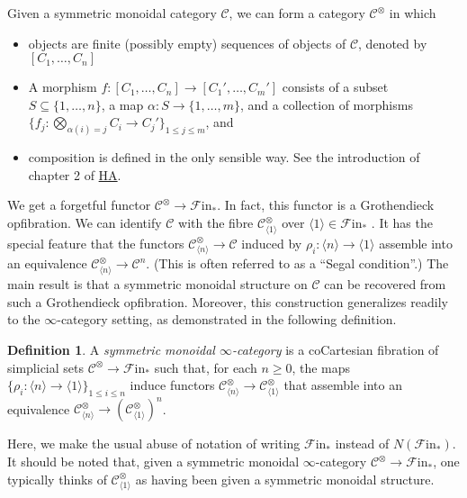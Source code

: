 \documentclass[letterpaper]{article}
\theoremstyle{definition}
\newtheorem{definition}[lemma]{Definition}
\begin{document}
Given a symmetric monoidal category $\mathcal{C}$, we can form a category $\mathcal{C}^\otimes$ in which
\begin{itemize}
    \item objects are finite (possibly empty) sequences of objects of $\mathcal{C}$, denoted by $[C_1, \ldots, C_n]$
    \item A morphism $f : [C_1, \ldots, C_n] \to [C_1', \ldots, C_m']$ consists of a subset $S \subseteq \{1, \ldots, n\}$, a map $\alpha : S \to \{1, \ldots, m\}$, and a collection of morphisms $\{f_j: \bigotimes_{\alpha(i)=j} C_i\to C_j'\}_{1 \leq j \leq m}$, and
    \item composition is defined in the only sensible way. See the introduction of chapter 2 of \href{References/LurieHigherAlgebra.pdf}{HA}.
\end{itemize}
We get a forgetful functor $\mathcal{C}^\otimes \to \mathscr{F}\mathrm{in}_*$. In fact, this functor is a Grothendieck opfibration. We can identify $\mathcal{C}$ with the fibre $\mathcal{C}^\otimes_{\langle 1 \rangle}$ over $\langle 1 \rangle \in \mathscr{F}\mathrm{in}_*$ . It has the special feature that the functors $\mathcal{C}^\otimes_{\langle n \rangle} \to \mathcal{C}$  induced by $\rho_i : \langle n \rangle \to \langle 1 \rangle$ assemble into an equivalence $\mathcal{C}^\otimes_{\langle n \rangle} \to \mathcal{C}^n$. (This is often referred to as a ``Segal condition''.) The main result is that a symmetric monoidal structure on $\mathcal{C}$ can be recovered from such a Grothendieck opfibration. Moreover, this construction generalizes readily to the $\infty$-category setting, as demonstrated in the following definition.

\begin{definition}
    A \emph{symmetric monoidal $\infty$-category} is a coCartesian fibration of simplicial sets $\mathcal{C}^\otimes \to \mathscr{F}\mathrm{in}_*$ such that, for each $n \geq 0$, the maps $\{\rho_i : \langle n \rangle \to \langle 1 \rangle \}_{1 \leq i \leq n}$ induce functors $\mathcal{C}^\otimes_{\langle n \rangle} \to \mathcal{C}^\otimes_{\langle 1 \rangle}$ that assemble into an equivalence $\mathcal{C}^\otimes_{\langle n \rangle} \to (\mathcal{C}^\otimes_{\langle 1 \rangle})^n$.
\end{definition}

Here, we make the usual abuse of notation of writing $\mathscr{F}\mathrm{in}_*$ instead of $N(\mathscr{F}\mathrm{in}_*)$. It should be noted that, given a symmetric monoidal $\infty$-category $\mathcal{C}^\otimes \to \mathscr{F}\mathrm{in}_*$, one typically thinks of $\mathcal{C}^\otimes_{\langle 1 \rangle}$ as having been given a symmetric monoidal structure.
\end{document}
